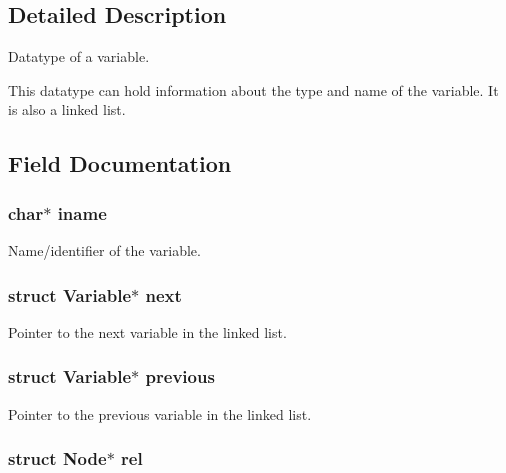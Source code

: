 \subsection{Detailed Description}
Datatype of a variable. 

This datatype can hold information about the type and name of the variable. It is also a linked list. 

\subsection{Field Documentation}
\hypertarget{structVariable_a76c70ae7ac3d58ebe41da968fedb8093}{
\subsubsection[{iname}]{\setlength{\rightskip}{0pt plus 5cm}char$\ast$ iname}}\label{structVariable_a76c70ae7ac3d58ebe41da968fedb8093}


Name/identifier of the variable. 

\hypertarget{structVariable_ac6387180163bef05cf8ea37a4fbd0682}{
\subsubsection[{next}]{\setlength{\rightskip}{0pt plus 5cm}struct {\bf Variable}$\ast$ next}}\label{structVariable_ac6387180163bef05cf8ea37a4fbd0682}


Pointer to the next variable in the linked list. 

\hypertarget{structVariable_ad27df2f2e773678c5804cc233343aed1}{
\subsubsection[{previous}]{\setlength{\rightskip}{0pt plus 5cm}struct {\bf Variable}$\ast$ previous}}\label{structVariable_ad27df2f2e773678c5804cc233343aed1}


Pointer to the previous variable in the linked list. 

\hypertarget{structVariable_adf9b74cb9b4f3a80e8af89e50bd11975}{
\subsubsection[{rel}]{\setlength{\rightskip}{0pt plus 5cm}struct {\bf Node}$\ast$ rel}}\label{structVariable_adf9b74cb9b4f3a80e8af89e50bd11975}


